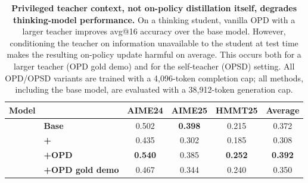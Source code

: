\begin{table}[t]
\centering
\caption{\textbf{Privileged teacher context, not on-policy distillation itself, degrades thinking-model performance.}
On a \qwenonesevenb{} thinking student, vanilla OPD with a larger \qweneightb{} teacher improves avg@16 accuracy over the base model. However, conditioning the teacher on information unavailable to the student at test time makes the resulting on-policy update harmful on average. This occurs both for a larger teacher (OPD gold demo) and for the self-teacher (OPSD) setting. All OPD/OPSD variants are trained with a 4,096-token completion cap; all methods, including the base model, are evaluated with a 38,912-token generation cap.}
\label{tab:qwen17_openthoughts_opsd_opd}
\footnotesize
\setlength{\tabcolsep}{3pt}
\renewcommand{\arraystretch}{1.12}

\newcommand{\metrichead}[1]{%
  \textbf{#1}%
}

\begin{tabular*}{\textwidth}{@{\extracolsep{\fill}}llcccc@{}}
\toprule
\textbf{Model}
&
& \metrichead{AIME24}
& \metrichead{AIME25}
& \metrichead{HMMT25}
& \metrichead{Average} \\
\midrule

\multirow{4}{*}{\textbf{\qwenonesevenb{}}}
& \textbf{Base}
& 0.502
& \textbf{0.398}
& 0.215
& 0.372 \\

&
\textbf{+\opsd{}}
& 0.435
& 0.302
& 0.185
& 0.308 \\

&
\textbf{+OPD}
& \textbf{0.540}
& 0.385
& \textbf{0.252}
& \textbf{0.392} \\

&
\textbf{+OPD gold demo}
& 0.467
& 0.344
& 0.240
& 0.350 \\

\bottomrule
\end{tabular*}
\end{table}
